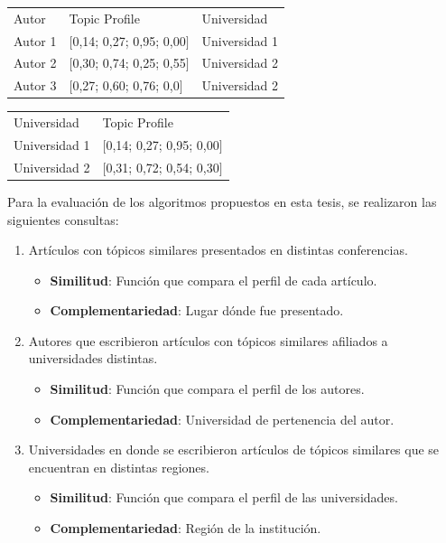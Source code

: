 \begin{table}[H]
\begin{tabular}{lll}
	Autor & Topic Profile & Universidad \\
	Autor 1 & $[$0,14; 0,27; 0,95; 0,00$]$ & Universidad 1 \\
	Autor 2 & $[$0,30; 0,74; 0,25; 0,55$]$ & Universidad 2 \\
	Autor 3 & $[$0,27; 0,60; 0,76; 0,0$]$ & Universidad 2 \\
\end{tabular}
\label{tabla:topicProfileEj2}
\end{table}

\begin{table}[H]
\begin{tabular}{ll}
	Universidad & Topic Profile \\
	Universidad 1 & $[$0,14; 0,27; 0,95; 0,00$]$ \\
	Universidad 2 & $[$0,31; 0,72; 0,54; 0,30$]$ \\
\end{tabular}
\label{tabla:topicProfileEj3}
\end{table}

Para la evaluación de los algoritmos propuestos en esta tesis, se realizaron las siguientes consultas:
\begin{enumerate}
	\item
		Artículos con tópicos similares presentados en distintas conferencias. \label{busqueda:articulos}
		\begin{itemize}
			\item \textbf{Similitud}: Función que compara el perfil de cada artículo.
			\item \textbf{Complementariedad}: Lugar dónde fue presentado.
		\end{itemize}

	\item
	Autores que escribieron artículos con tópicos similares afiliados a universidades distintas. \label{busqueda:autores}
	\begin{itemize}
		\item \textbf{Similitud}: Función que compara el perfil de los autores.
		\item \textbf{Complementariedad}: Universidad de pertenencia del autor.
	\end{itemize}

	\item 
	Universidades en donde se escribieron artículos de tópicos similares que se encuentran en distintas regiones. \label{busqueda:universidades}
	\begin{itemize}
		\item \textbf{Similitud}: Función que compara el perfil de las universidades.
		\item \textbf{Complementariedad}: Región de la institución.
	\end{itemize}
\end {enumerate}

